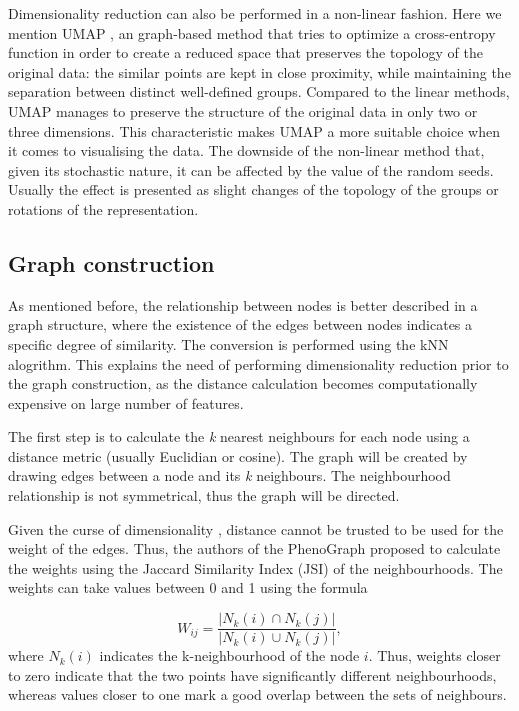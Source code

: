     Dimensionality reduction can also be performed in a non-linear fashion. Here we mention UMAP \cite{mcinnes2018uniform}, an graph-based method that tries to optimize a cross-entropy function in order to create a reduced space that preserves the topology of the original data: the similar points are kept in close proximity, while maintaining the separation between distinct well-defined groups. Compared to the linear methods, UMAP manages to preserve the structure of the original data in only two or three dimensions. This characteristic makes UMAP a more suitable choice when it comes to visualising the data. The downside of the non-linear method that, given its stochastic nature, it can be affected by the value of the random seeds. Usually the effect is presented as slight changes of the topology of the groups or rotations of the representation.

    \subsection{Graph construction}
    As mentioned before, the relationship between nodes is better described in a graph structure, where the existence of the edges between nodes indicates a specific degree of similarity. The conversion is performed using the kNN alogrithm. This explains the need of performing dimensionality reduction prior to the graph construction, as the distance calculation becomes computationally expensive on large number of features.
    
    The first step is to calculate the \textit{k} nearest neighbours for each node using a distance metric (usually Euclidian or cosine). The graph will be created by drawing edges between a node and its \textit{k} neighbours. The neighbourhood relationship is not symmetrical, thus the graph will be directed. 
    
    Given the curse of dimensionality \cite{Altman2018}, distance cannot be trusted to be used for the weight of the edges. Thus, the authors of the PhenoGraph proposed to calculate the weights using the Jaccard Similarity Index (JSI) of the neighbourhoods. The weights can take values between 0 and 1 using the formula 
    
    \[ W_{ij} = \frac{|N_k(i) \cap N_k(j)|}{|N_k(i) \cup N_k(j)|}, \] where $N_k(i)$ indicates the k-neighbourhood of the node $i$. Thus, weights closer to zero indicate that the two points have significantly different neighbourhoods, whereas values closer to one mark a good overlap between the sets of neighbours.

